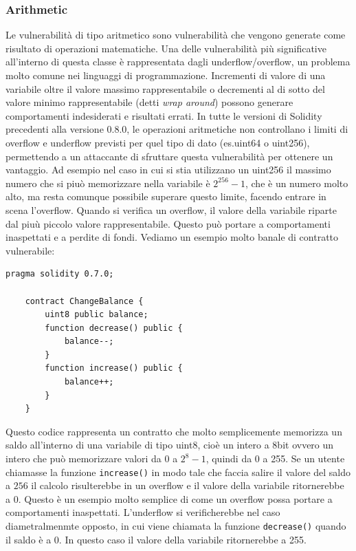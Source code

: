 \documentclass[../../Thesis.tex]{subfiles}
\begin{document}
\subsubsection{Arithmetic}
Le vulnerabilità di tipo aritmetico \cite{sc-vulnerabilities} sono vulnerabilità che vengono generate come risultato di operazioni matematiche. Una delle vulnerabilità più significative all'interno di questa classe è rappresentata dagli underflow/overflow, un problema molto comune nei linguaggi di programmazione. Incrementi di valore di una variabile oltre il valore massimo rappresentabile o decrementi al di sotto del valore minimo rappresentabile (detti \emph{wrap around}) possono generare comportamenti indesiderati e risultati errati. In tutte le versioni di Solidity precedenti alla versione 0.8.0, le operazioni aritmetiche non controllano i limiti di overflow e underflow previsti per quel tipo di dato (es.uint64 o uint256), permettendo a un attaccante di sfruttare questa vulnerabilità per ottenere un vantaggio. Ad esempio nel caso in cui si stia utilizzano un uint256 il massimo numero che si piuò memorizzare nella variabile è $2^256 - 1$, che è un numero molto alto, ma resta comunque possibile superare questo limite, facendo entrare in scena l'overflow. Quando si verifica un overflow, il valore della variabile riparte dal piuù piccolo valore rappresentabile. Questo può portare a comportamenti inaspettati e a perdite di fondi. Vediamo un esempio molto banale di contratto vulnerabile:
\begin{lstlisting}[language=Solidity]
    pragma solidity 0.7.0;

    contract ChangeBalance {
        uint8 public balance;
        function decrease() public {
            balance--;
        }
        function increase() public {
            balance++;
        }
    }
\end{lstlisting}
Questo codice rappresenta un contratto che molto semplicemente memorizza un saldo all'interno di una variabile di tipo uint8, cioè un intero a 8bit ovvero un intero che può memorizzare valori da 0 a $2^8-1$, quindi da 0 a 255. Se un utente chiamasse la funzione \texttt{increase()} in modo tale che faccia salire il valore del saldo a $256$ il calcolo risulterebbe in un overflow e il valore della variabile ritornerebbe a 0. Questo è un esempio molto semplice di come un overflow possa portare a comportamenti inaspettati. L'underflow si verificherebbe nel caso diametralmenmte opposto, in cui viene chiamata la funzione \texttt{decrease()} quando il saldo è a 0. In questo caso il valore della variabile ritornerebbe a 255.
\end{document}
